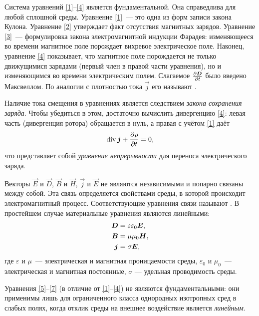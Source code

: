 Система уравнений \eqref{1}--\eqref{4} является фундаментальной. Она справедлива
для любой сплошной среды. Уравнение \eqref{1}~--- это одна из форм записи закона Кулона. 
Уравнение \eqref{2} утверждает факт отсутствия магнитных зарядов.
Уравнение \eqref{3}~--- формулировка закона электромагнитной индукции Фарадея: 
изменяющееся во времени магнитное поле порождает вихревое электрическое поле.
Наконец, уравнение \eqref{4} показывает, что магнитное поле порождается не только 
движущимися зарядами (первый член в правой части уравнения), но и изменяющимся 
во времени электрическим полем. Слагаемое $\frac{\partial {\boldsymbol{D}}}{\partial t}$ было введено Максвеллом.
По аналогии с плотностью тока $\vec{j}$ его называют .

\begin{lab:note}
Наличие тока смещения в уравнениях является следствием \emph{закона сохранения заряда}.
Чтобы убедиться в этом, достаточно вычислить дивергенцию \eqref{4}:
левая часть (дивергенция ротора) обращается в нуль, а правая с учётом 
\eqref{1} даёт
\begin{equation}
\eqmark{cont}
\Div \vec{j} + \ddt{\rho} = 0,
\end{equation}
что представляет собой \emph{уравнение непрерывности} для переноса электрического заряда.
\end{lab:note}
 
Векторы $\vec{E}$ и $\vec{D}$, $\vec{B}$ и $\vec{H}$, $\vec{j}$ и $\vec{E}$ 
не являются независимыми и попарно связаны между собой. Эта связь 
определяется свойствами среды, в которой происходит электромагнитный процесс. 
Соответствующие уравнения связи называют .
В простейшем случае материальные уравнения являются линейными:
\begin{align}
\eqmark{5}
\vec{D}&=\varepsilon\varepsilon_0\vec{E},\\
\eqmark{6}
\vec{B}&=\mu\mu_0\vec{H},\\
\eqmark{7}
\vec{j}&=\sigma\vec{E},
\end{align}
где $\varepsilon$ и $\mu$~--- электрическая и магнитная проницаемости среды,
$\varepsilon_0$ и $\mu_0$~--- электрическая и магнитная постоянные,
$\sigma$ --- удельная проводимость среды.
\begin{lab:note}
Уравнения \eqref{5}--\eqref{7} (в отличие от \eqref{1}--\eqref{4})
не являются фундаментальными: они применимы лишь для ограниченного класса 
однородных изотропных сред в слабых полях, когда отклик среды на внешнее
воздействие является \emph{линейным}.
\end{lab:note}

